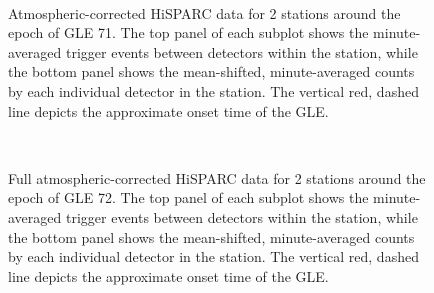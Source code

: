 \begin{figure}[ht]
	\centering
	 \\
	
	
	\caption{Atmospheric-corrected HiSPARC data for 2 stations around the epoch of GLE 71. The top panel of each subplot shows the minute-averaged trigger events between detectors within the station, while the bottom panel shows the mean-shifted, minute-averaged counts by each individual detector in the station. The vertical red, dashed line depicts the approximate onset time of the GLE.}
	\label{fig:GLE_71_Pcorr}
\end{figure}

\begin{figure}[ht]
	\centering
	 \\
	
	
	\caption{Full atmospheric-corrected HiSPARC data for 2 stations around the epoch of GLE 72. The top panel of each subplot shows the minute-averaged trigger events between detectors within the station, while the bottom panel shows the mean-shifted, minute-averaged counts by each individual detector in the station. The vertical red, dashed line depicts the approximate onset time of the GLE.}
	\label{fig:GLE_72_Pcorr}
\end{figure}

